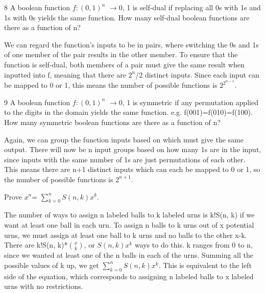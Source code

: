 
\begin{problem} 8 {A boolean function $ f: {(0, 1)}^n $  $\rightarrow $0, 1 is self-dual if replacing all 0s with 1s and 1s with 0s yields the same function. How many self-dual boolean functions are there as a function of n?}
\end{problem}

We can regard the function's inputs to be in pairs, where switching the 0s and 1s of one member of the pair results in the other member. To ensure that the function is self-dual, both members of a pair must give the same result when inputted into f, meaning that there are $2^n$/2 distinct inputs. Since each input can be mapped to 0 or 1, this means the number of possible functions is $2^{2^{n-1}}$.


\begin{problem} 9 {A boolean function $ f: {(0, 1)}^n $  $\rightarrow $0, 1 is symmetric if any permutation applied to the digits in the domain yields the same function. e.g. f(001)=f(010)=f(100). How many symmetric boolean functions are there as a function of n?}
\end{problem}
    Again, we can group the function inputs based on which must give the same output. There will now be n input groups based on how many 1s are in the input, since inputs with the same number of 1s are just permutations of each other. This means there are n+1 distinct inputs which can each be mapped to 0 or 1, so the number of possible functions is $2^{n+1}$.


\begin{problem}{10}{Prove $x^n$= $\sum_{k=0}^{n} {S(n, k)x^{\underline{k}}}$.}
\end{problem}
The number of ways to assign n labeled balls to k labeled urns is k!S(n, k) if we want at least one ball in each urn. To assign n balls to k urns out of x potential urns, we must assign at least one ball to k urns and no balls to the other x-k. There are k!S(n, k)*$\binom x k$, or $S(n, k)x^{\underline{k}}$ ways to do this. k ranges from 0 to n, since we wanted at least one of the n balls in each of the urns. Summing all the possible values of k up, we get $\sum_{k=0}^{n} {S(n, k)x^{\underline{k}}}$. This is equivalent to the left side of the equation, which corresponds to assigning n labeled balls to x labeled urns with no restrictions. 


